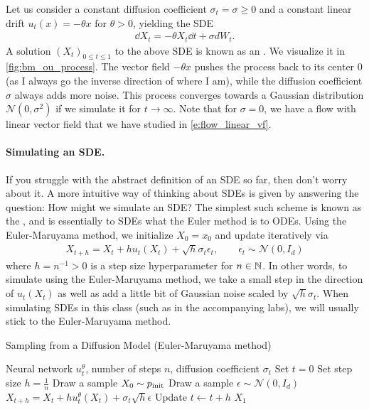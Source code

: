 \begin{examplebox}
Let us consider a constant diffusion coefficient $\sigma_t=\sigma\geq 0$ and a constant linear drift $u_t(x)=-\theta x$ for $\theta>0$, yielding the SDE
\begin{align}
\label{eq:ohrstein_uhlenbeck_process}
\dd X_t = -\theta X_t\dd t + \sigma dW_t.
\end{align} 
A solution $(X_t)_{0 \le t \le 1}$ to the above SDE is known as an . We visualize it in \cref{fig:bm_ou_process}. The vector field $-\theta x$ pushes the process back to its center $0$ (as I always go the inverse direction of where I am), while the diffusion coefficient $\sigma$ always adds more noise. This process converges towards a Gaussian distribution $\mathcal{N}(0,\sigma^2)$ if we simulate it for $t\to \infty$. Note that for $\sigma=0$, we have a flow with linear vector field that we have studied in \cref{e:flow_linear_vf}.
\end{examplebox}


\paragraph{Simulating an SDE.} If you struggle with the abstract definition of an SDE so far, then don't worry about it. A more intuitive way of thinking about SDEs is given by answering the question: How might we simulate an SDE? The simplest such scheme is known as the , and is essentially to SDEs what the Euler method is to ODEs. Using the Euler-Maruyama method, we initialize $X_0=x_0$ and update iteratively via
\begin{align}
\label{e:euler_method_sdes}
    X_{t+h} = X_{t}+hu_t(X_t) + \sqrt{h}\sigma_t\epsilon_t,\quad \quad \epsilon_t \sim \mathcal{N}(0,I_d)
\end{align}
where $h=n^{-1}>0$ is a step size hyperparameter for $n \in \mathbb N$. In other words, to simulate using the Euler-Maruyama method, we take a small step in the direction of $u_t(X_t)$ as well as add a little bit of Gaussian noise scaled by $\sqrt{h}\sigma_t$. When simulating SDEs in this class (such as in the accompanying labs), we will usually stick to the Euler-Maruyama method.

\begin{algorithm}[h]
\caption{Sampling from a Diffusion Model (Euler-Maruyama  method)}
\label{alg:sampling_diffusion_model}
\begin{algorithmic}[1]
\REQUIRE Neural network $u_t^\theta$, number of steps $n$, diffusion coefficient $\sigma_t$
\STATE Set $t=0$
\STATE Set step size $h=\frac{1}{n}$
\STATE Draw a sample $X_0\sim p_{\rm{init}}$
    \STATE Draw a sample $\epsilon\sim \mathcal{N}(0,I_d)$
    \STATE $X_{t+h} = X_{t} + h u_t^\theta(X_t)+\sigma_t\sqrt{h}\epsilon$
    \STATE Update $t\leftarrow t+h$
\ENDFOR
\RETURN $X_1$
\end{algorithmic}
\end{algorithm}

